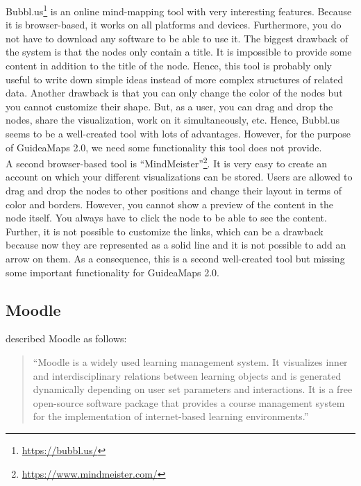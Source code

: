 Bubbl.us\footnote{\url{https://bubbl.us/}} is an online mind-mapping tool with very interesting features. Because it is browser-based, it works on all platforms and devices. Furthermore, you do not have to download any software to be able to use it. The biggest drawback of the system is that the nodes only contain a title. It is impossible to provide some content in addition to the title of the node. Hence, this tool is probably only useful to write down simple ideas instead of more complex structures of related data. Another drawback is that you can only change the color of the nodes but you cannot customize their shape. But, as a user, you can drag and drop the nodes, share the visualization, work on it simultaneously, etc. Hence, Bubbl.us seems to be a well-created tool with lots of advantages. However, for the purpose of GuideaMaps 2.0, we need some functionality this tool does not provide.\\

A second browser-based tool is ``MindMeister''\footnote{\url{https://www.mindmeister.com/}}. It is very easy to create an account on which your different visualizations can be stored. Users are allowed to drag and drop the nodes to other positions and change their layout in terms of color and borders. However, you cannot show a preview of the content in the node itself. You always have to click the node to be able to see the content. Further, it is not possible to customize the links, which can be a drawback because now they are represented as a solid line and it is not possible to add an arrow on them. As a consequence, this is a second well-created tool but missing some important functionality for GuideaMaps 2.0.


\subsection{Moodle}

\cite{scherl2012moodle} described Moodle as follows:
\begin{quote}
	``Moodle is a widely used learning management system. It visualizes inner and interdisciplinary relations between learning objects and is generated dynamically depending on user set parameters and interactions. It is a free open-source software package that provides a course management system for the implementation of internet-based learning environments.''
\end{quote}

